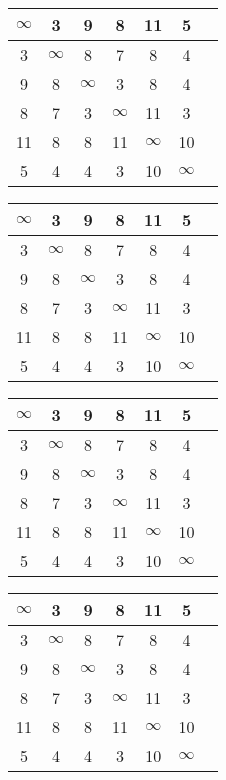 \documentclass[a4paper,10pt]{article} %
\begin{document}
\begin{tabular}[]{|c|c|c|c|c|c|c|}
\hline
$\infty$ &    3 &    9 &    8 &   11 &    5 \\
\hline
  3 &  $\infty$ &    8 &    7 &    8 &    4 \\
\hline
  9 &    8 &  $\infty$ &    3 &    8 &    4 \\
\hline
  8 &    7 &    3 &  $\infty$ &   11 &    3 \\
\hline
 11 &    8 &    8 &   11 &  $\infty$ &   10 \\
\hline
  5 &    4 &    4 &    3 &   10 &  $\infty$ \\
\hline
\end{tabular}
\hspace{4cm}
\begin{tabular}[]{|c|c|c|c|c|c|c|}
\hline
$\infty$ &    3 &    9 &    8 &   11 &    5 \\
\hline
  3 &  $\infty$ &    8 &    7 &    8 &    4 \\
\hline
  9 &    8 &  $\infty$ &    3 &    8 &    4 \\
\hline
  8 &    7 &    3 &  $\infty$ &   11 &    3 \\
\hline
 11 &    8 &    8 &   11 &  $\infty$ &   10 \\
\hline
  5 &    4 &    4 &    3 &   10 &  $\infty$ \\
\hline
\end{tabular}

\medskip

\begin{tabular}[]{|c|c|c|c|c|c|c|}
\hline
$\infty$ &    3 &    9 &    8 &   11 &    5 \\
\hline
  3 &  $\infty$ &    8 &    7 &    8 &    4 \\
\hline
  9 &    8 &  $\infty$ &    3 &    8 &    4 \\
\hline
  8 &    7 &    3 &  $\infty$ &   11 &    3 \\
\hline
 11 &    8 &    8 &   11 &  $\infty$ &   10 \\
\hline
  5 &    4 &    4 &    3 &   10 &  $\infty$ \\
\hline
\end{tabular}
\hspace{4cm}
\begin{tabular}[]{|c|c|c|c|c|c|c|}
\hline
$\infty$ &    3 &    9 &    8 &   11 &    5 \\
\hline
  3 &  $\infty$ &    8 &    7 &    8 &    4 \\
\hline
  9 &    8 &  $\infty$ &    3 &    8 &    4 \\
\hline
  8 &    7 &    3 &  $\infty$ &   11 &    3 \\
\hline
 11 &    8 &    8 &   11 &  $\infty$ &   10 \\
\hline
  5 &    4 &    4 &    3 &   10 &  $\infty$ \\
\hline
\end{tabular}
\end{document}

